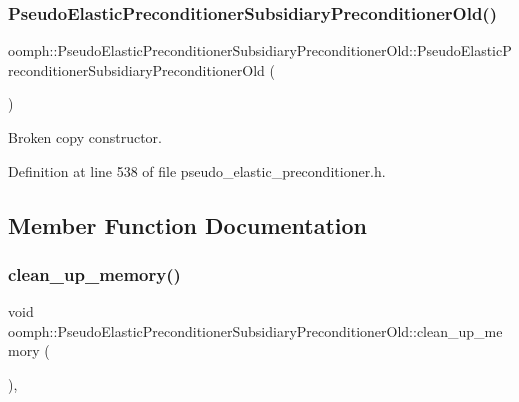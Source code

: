\subsubsection{\texorpdfstring{Pseudo\+Elastic\+Preconditioner\+Subsidiary\+Preconditioner\+Old()}{PseudoElasticPreconditionerSubsidiaryPreconditionerOld()}\hspace{0.1cm}{\footnotesize\ttfamily [2/2]}}
{\footnotesize\ttfamily oomph\+::\+Pseudo\+Elastic\+Preconditioner\+Subsidiary\+Preconditioner\+Old\+::\+Pseudo\+Elastic\+Preconditioner\+Subsidiary\+Preconditioner\+Old (\begin{DoxyParamCaption}\item[{const \hyperlink{classoomph_1_1PseudoElasticPreconditionerSubsidiaryPreconditionerOld}{Pseudo\+Elastic\+Preconditioner\+Subsidiary\+Preconditioner\+Old} \&}]{ }\end{DoxyParamCaption})\hspace{0.3cm}{\ttfamily [inline]}}



Broken copy constructor. 



Definition at line 538 of file pseudo\+\_\+elastic\+\_\+preconditioner.\+h.



\subsection{Member Function Documentation}
\mbox{\label{classoomph_1_1PseudoElasticPreconditionerSubsidiaryPreconditionerOld_a45086bd75b2d82f65deae8cac23c4c47}} 
\subsubsection{\texorpdfstring{clean\+\_\+up\+\_\+memory()}{clean\_up\_memory()}}
{\footnotesize\ttfamily void oomph\+::\+Pseudo\+Elastic\+Preconditioner\+Subsidiary\+Preconditioner\+Old\+::clean\+\_\+up\+\_\+memory (\begin{DoxyParamCaption}{ }\end{DoxyParamCaption})\hspace{0.3cm}{\ttfamily [inline]}, {\ttfamily [private]}}



